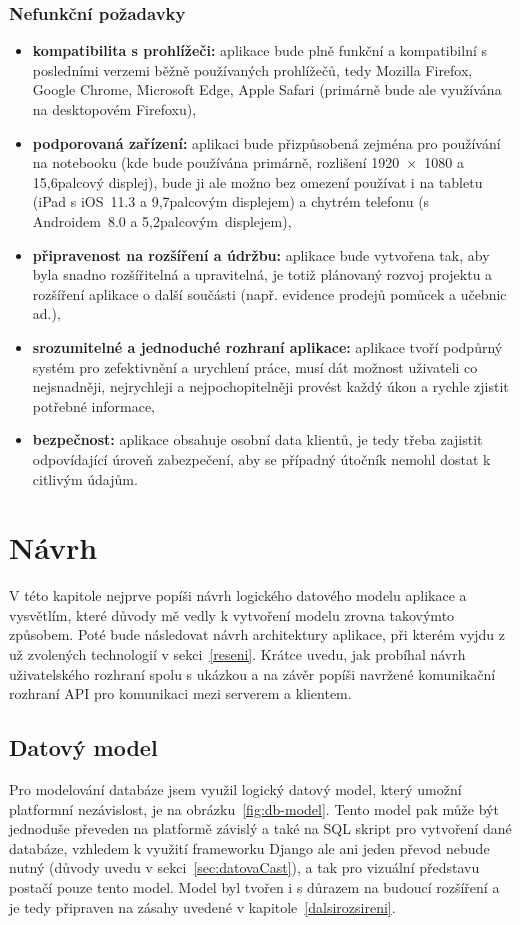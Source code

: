     \subsection{Nefunkční požadavky}
    \begin{itemize}
        \item \textbf{kompatibilita s prohlížeči:} aplikace bude plně funkční a kompatibilní s posledními verzemi běžně používaných prohlížečů, tedy Mozilla Firefox, Google Chrome, Microsoft Edge, Apple Safari (primárně bude ale využívána na desktopovém Firefoxu),
        \item \textbf{podporovaná zařízení:} aplikaci bude přizpůsobená zejména pro používání na notebooku (kde bude používána primárně, rozlišení 1920~×~1080 a 15,6palcový displej), bude ji ale možno bez omezení používat i na tabletu (iPad s iOS~11.3 a 9,7palcovým displejem) a chytrém telefonu (s Androidem~8.0 a 5,2palcovým~displejem),
        \item \textbf{připravenost na rozšíření a údržbu:} aplikace bude vytvořena tak, aby byla snadno rozšířitelná a upravitelná, je totiž plánovaný rozvoj projektu a rozšíření aplikace o další součásti (např. evidence prodejů pomůcek a učebnic ad.),
        \item \textbf{srozumitelné a jednoduché rozhraní aplikace:} aplikace tvoří podpůrný systém pro zefektivnění a urychlení práce, musí dát možnost uživateli co nejsnadněji, nejrychleji a nejpochopitelněji provést každý úkon a rychle zjistit potřebné informace,
        \item \textbf{bezpečnost:} aplikace obsahuje osobní data klientů, je tedy třeba zajistit odpovídající úroveň zabezpečení, aby se případný útočník nemohl dostat k citlivým údajům.
    \end{itemize}
    
\chapter{Návrh}\label{navrh}
V této kapitole nejprve popíši návrh logického datového modelu aplikace a vysvětlím, které důvody mě vedly k vytvoření modelu zrovna takovýmto způsobem. Poté bude následovat návrh architektury aplikace, při kterém vyjdu z už zvolených technologií v sekci~\ref{reseni}. Krátce uvedu, jak probíhal návrh uživatelského rozhraní spolu s ukázkou a na závěr popíši navržené komunikační rozhraní API pro komunikaci mezi serverem a klientem. 

    \section{Datový model}\label{datovymodel}
    Pro modelování databáze jsem využil logický datový model, který umožní platformní nezávislost, je na obrázku~\ref{fig:db-model}. Tento model pak může být jednoduše převeden na platformě závislý a také na SQL skript pro vytvoření dané databáze, vzhledem k využití frameworku Django ale ani jeden převod nebude nutný (důvody uvedu v sekci~\ref{sec:datovaCast}), a tak pro vizuální představu postačí pouze tento model. Model byl tvořen i s důrazem na budoucí rozšíření a je tedy připraven na zásahy uvedené v kapitole~\ref{dalsirozsireni}.
    
